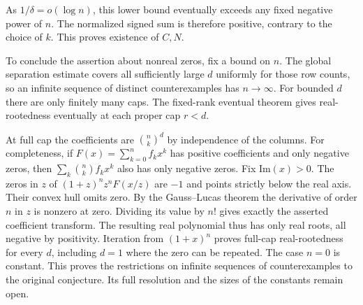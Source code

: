 As $1/\delta=o(\log n)$, this lower bound eventually exceeds any fixed negative power of $n$. The normalized signed sum is therefore positive, contrary to the choice of $k$. This proves existence of $C,N$.

To conclude the assertion about nonreal zeros, fix a bound on $n$. The global separation estimate covers all sufficiently large $d$ uniformly for those row counts, so an infinite sequence of distinct counterexamples has $n\to\infty$. For bounded $d$ there are only finitely many caps. The fixed-rank eventual theorem gives real-rootedness eventually at each proper cap $r<d$.

At full cap the coefficients are $\binom nk^d$ by independence of the columns. For completeness, if $F(x)=\sum_{k=0}^n f_kx^k$ has positive coefficients and only negative zeros, then $\sum_k\binom nk f_k x^k$ also has only negative zeros. Fix $\mathrm{Im}(x)>0$. The zeros in $z$ of $(1+z)^n z^n F(x/z)$ are $-1$ and points strictly below the real axis. Their convex hull omits zero. By the Gauss--Lucas theorem the derivative of order $n$ in $z$ is nonzero at zero. Dividing its value by $n!$ gives exactly the asserted coefficient transform. The resulting real polynomial thus has only real roots, all negative by positivity. Iteration from $(1+x)^n$ proves full-cap real-rootedness for every $d$, including $d=1$ where the zero can be repeated. The case $n=0$ is constant. This proves the restrictions on infinite sequences of counterexamples to the original conjecture. Its full resolution and the sizes of the constants remain open.
